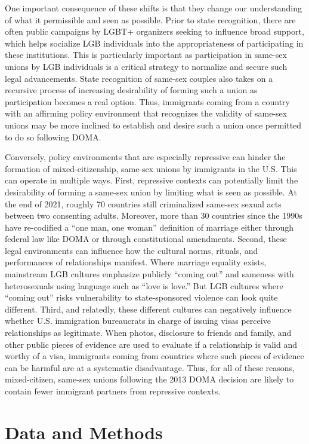 \documentclass[
  11pt,
]{article}
\begin{document}
One important consequence of these shifts is that they change our understanding of what it permissible and seen as possible. Prior to state recognition, there are often public campaigns by LGBT+ organizers seeking to influence broad support, which helps socialize LGB individuals into the appropriateness of participating in these institutions. This is particularly important as participation in same-sex unions by LGB individuals is a critical strategy to normalize and secure such legal advancements. State recognition of same-sex couples also takes on a recursive process of increasing desirability of forming such a union as participation becomes a real option. Thus, immigrants coming from a country with an affirming policy environment that recognizes the validity of same-sex unions may be more inclined to establish and desire such a union once permitted to do so following DOMA.

Conversely, policy environments that are especially repressive can hinder the formation of mixed-citizenship, same-sex unions by immigrants in the U.S. This can operate in multiple ways. First, repressive contexts can potentially limit the desirability of forming a same-sex union by limiting what is seen as possible. At the end of 2021, roughly 70 countries still criminalized same-sex sexual acts between two consenting adults. Moreover, more than 30 countries since the 1990s have re-codified a ``one man, one woman'' definition of marriage either through federal law like DOMA or through constitutional amendments. Second, these legal environments can influence how the cultural norms, rituals, and performances of relationships manifest. Where marriage equality exists, mainstream LGB cultures emphasize publicly ``coming out'' and sameness with heterosexuals using language such as ``love is love.'' But LGB cultures where ``coming out'' risks vulnerability to state-sponsored violence can look quite different. Third, and relatedly, these different cultures can negatively influence whether U.S. immigration bureaucrats in charge of issuing visas perceive relationships as legitimate. When photos, disclosure to friends and family, and other public pieces of evidence are used to evaluate if a relationship is valid and worthy of a visa, immigrants coming from countries where such pieces of evidence can be harmful are at a systematic disadvantage. Thus, for all of these reasons, mixed-citizen, same-sex unions following the 2013 DOMA decision are likely to contain fewer immigrant partners from repressive contexts.

\hypertarget{data-and-methods}{%
\section{Data and Methods}\label{data-and-methods}}
\end{document}
